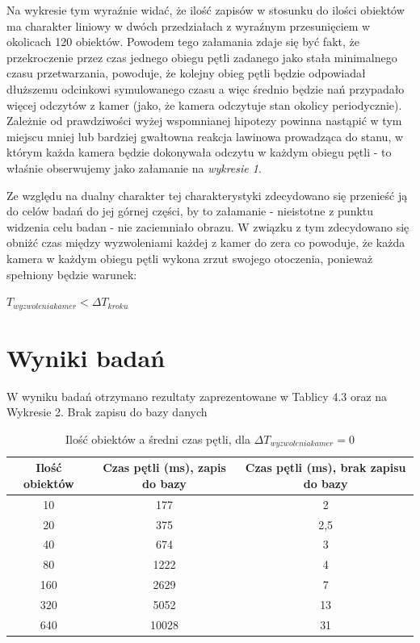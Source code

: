 \par{
Na wykresie tym wyraźnie widać, że ilość zapisów w stosunku do ilości obiektów ma charakter liniowy w dwóch przedziałach z wyraźnym przesunięciem w okolicach 120 obiektów. Powodem tego załamania zdaje się być fakt, że przekroczenie przez czas jednego obiegu pętli zadanego jako stała minimalnego czasu przetwarzania, powoduje, że kolejny obieg pętli będzie odpowiadał dłuższemu odcinkowi symulowanego czasu a więc średnio będzie nań przypadało więcej odczytów z kamer (jako, że kamera odczytuje stan okolicy periodycznie). Zależnie od prawdziwości wyżej wspomnianej hipotezy powinna nastąpić w tym miejscu mniej lub bardziej gwałtowna reakcja lawinowa prowadząca do stanu, w którym każda kamera będzie dokonywała odczytu w każdym obiegu pętli - to właśnie obserwujemy jako załamanie na \textit{wykresie 1}.
}
\par{
Ze względu na dualny charakter tej charakterystyki zdecydowano się przenieść ją do celów badań do jej górnej części, by to załamanie - nieistotne z punktu widzenia celu badan - nie zaciemniało obrazu. W związku z tym zdecydowano się obniżć czas między wyzwoleniami każdej z kamer do zera co powoduje, że każda kamera w każdym obiegu pętli wykona zrzut swojego otoczenia, ponieważ spełniony będzie warunek:
}
\par{
\begin{center}
$T_{wyzwolenia kamer} < \Delta T_{kroku}$
\end{center}
}

\section{Wyniki badań}
\par{
W wyniku badań otrzymano rezultaty zaprezentowane w Tablicy 4.3 oraz na Wykresie 2.
}
	Brak zapisu do bazy danych

\par{
\begin{table}[t]
\caption{Ilość obiektów a średni czas pętli, dla $\Delta T_{wyzwolenia kamer} = 0$}
\label{Tabela 1}
\begin{center}
\begin{tabular}{|c|c|c|}
  \hline 
  \textbf{Ilość obiektów} & \textbf{Czas pętli (ms), zapis do bazy} & \textbf{Czas pętli (ms), brak zapisu do bazy}\\
  \hline
10 & 177 & 2 \\
20 & 375 & 2,5 \\
40 & 674 & 3 \\
80 & 1222 & 4 \\
160 & 2629 & 7 \\
320 & 5052 & 13 \\
640 & 10028 & 31 \\
  \hline  
\end{tabular}
\end{center}
\end{table}
}


